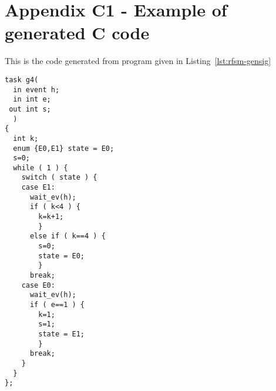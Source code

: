 \chapter*{Appendix C1 - Example of generated C code}  
\label{cha:ex1-c}

This is the code generated from program given in Listing~\ref{lst:rfsm-gensig} 

\begin{lstlisting}[language=ctask,frame=single,numbers=none,basicstyle=\small]
task g4(
  in event h;
  in int e;
 out int s;
  )
{
  int k;
  enum {E0,E1} state = E0;
  s=0;
  while ( 1 ) {
    switch ( state ) {
    case E1:
      wait_ev(h);
      if ( k<4 ) {
        k=k+1;
        }
      else if ( k==4 ) {
        s=0;
        state = E0;
        }
      break;
    case E0:
      wait_ev(h);
      if ( e==1 ) {
        k=1;
        s=1;
        state = E1;
        }
      break;
    }
  }
};
\end{lstlisting}
